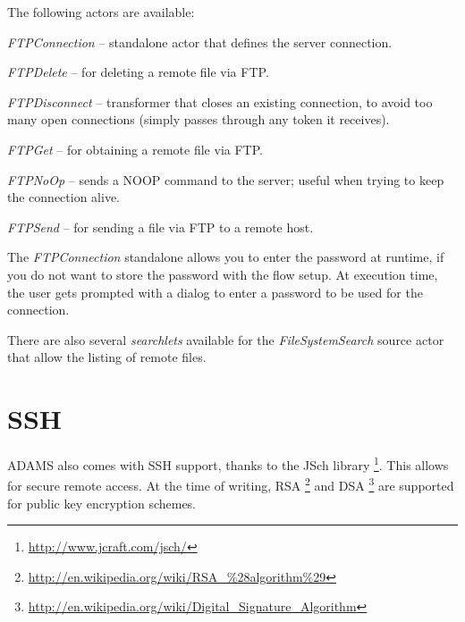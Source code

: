 \documentclass[a4paper]{book}
\begin{document}
The following actors are available:
\begin{tight_itemize}
	\item \textit{FTPConnection} -- standalone actor that defines the server
	connection.
	\item \textit{FTPDelete} -- for deleting a remote file via FTP.
	\item \textit{FTPDisconnect} -- transformer that closes an existing
	connection, to avoid too many open connections (simply passes through any 
	token it receives).
	\item \textit{FTPGet} -- for obtaining a remote file via FTP.
	\item \textit{FTPNoOp} -- sends a NOOP command to the server; useful when
	trying to keep the connection alive.
	\item \textit{FTPSend} -- for sending a file via FTP to a remote host.
\end{tight_itemize}
The \textit{FTPConnection} standalone allows you to enter the password at 
runtime, if you do not want to store the password with the
flow setup. At execution time, the user gets prompted with a dialog to enter
a password to be used for the connection.

There are also several \textit{searchlets} available for the
\textit{FileSystemSearch} source actor that allow the listing of remote
files.


\chapter{SSH}
ADAMS also comes with SSH support, thanks to the JSch library
\footnote{\url{http://www.jcraft.com/jsch/}{}}. This allows for secure remote
access. At the time of writing, RSA
\footnote{\url{http://en.wikipedia.org/wiki/RSA_\%28algorithm\%29}{}} and DSA
\footnote{\url{http://en.wikipedia.org/wiki/Digital_Signature_Algorithm}{}} are
supported for public key encryption schemes.
\end{document}
